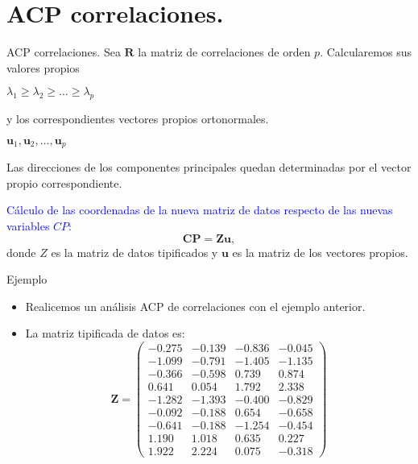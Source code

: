 \documentclass[
  spanish,
  ignorenonframetext,
]{beamer}
\providecommand{\tightlist}{%
  \setlength{\itemsep}{0pt}\setlength{\parskip}{0pt}}
\newcommand\blue[1]{\textcolor{blue}{#1}}
\begin{document}
\hypertarget{acp-correlaciones.}{%
\section{ACP correlaciones.}\label{acp-correlaciones.}}

\begin{frame}{ACP correlaciones.}
\protect\hypertarget{acp-correlaciones.-1}{}
Sea \(\mathbf{R}\) la matriz de correlaciones de orden \(p\).
Calcularemos sus valores propios

\(\lambda_1\geq \lambda_2\geq\ldots\geq\lambda_p\)

y los correspondientes vectores propios ortonormales.

\(\mathbf{u}_1,\mathbf{u}_2,\ldots,\mathbf{u}_p\)

Las direcciones de los componentes principales quedan determinadas por
el vector propio correspondiente.

\blue{Cálculo de las coordenadas de la nueva matriz de datos respecto de las
nuevas variables $CP$:} \[\mathbf{CP}= \mathbf{Z} \mathbf{u},\] donde
\(Z\) es la matriz de datos tipificados y \(\mathbf{u}\) es la matriz de
los vectores propios.
\end{frame}

\begin{frame}{Ejemplo}
\protect\hypertarget{ejemplo-6}{}
\begin{itemize}
\tightlist
\item
  Realicemos un análisis ACP de correlaciones con el ejemplo anterior.
\item
  La matriz tipificada de datos es: \[
  \mathbf{Z}=
  \left(
  \begin{array}{rrrr}
  -0.275 & -0.139 & -0.836 & -0.045 \\
   -1.099 & -0.791 & -1.405 & -1.135 \\
   -0.366 & -0.598 & 0.739 & 0.874 \\
   0.641 & 0.054 & 1.792 & 2.338 \\
   -1.282 & -1.393 & -0.400 & -0.829 \\
   -0.092 & -0.188 & 0.654 & -0.658 \\
   -0.641 & -0.188 & -1.254 & -0.454 \\
   1.190 & 1.018 & 0.635 & 0.227 \\
   1.922 & 2.224 & 0.075 & -0.318 
  \end{array}
  \right)
  \]
\end{itemize}
\end{frame}
\end{document}
